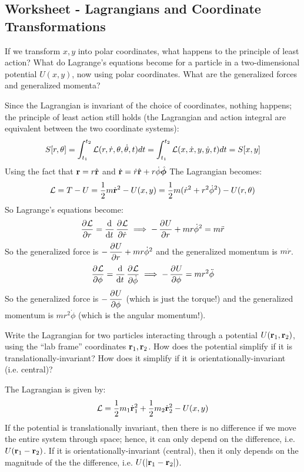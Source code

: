 \documentclass[../PHYS306Notes.tex]{subfiles}
\begin{document}
\subsection{Worksheet - Lagrangians and Coordinate Transformations}
\begin{p}
If we transform $x, y$ into polar coordinates, what happens to the principle of least action? What do Lagrange’s equations become for a particle in a two-dimensional potential $U(x,y)$, now using polar coordinates. What are the generalized forces and generalized momenta? 
\end{p}
\begin{s}
Since the Lagrangian is invariant of the choice of coordinates, nothing happens; the principle of least action still holds (the Lagrangian and action integral are equivalent between the two coordinate systems):
\[S[r, \theta] = \int_{t_1}^{t_2}\mathcal{L}(r, \dot{r}, \theta, \dot{\theta}, t)dt = \int_{t_1}^{t_2} \mathcal{L}(x, \dot{x}, y, \dot{y}, t)dt = S[x, y]\]
Using the fact that $\mathbf{r} = r\hat{\mathbf{r}}$ and $\dot{\mathbf{r}} = \dot{r}\hat{\mathbf{r}} + r\dot{\phi}\hat{\bm{\phi}}$ The Lagrangian becomes:
\[\mathcal{L} = T - U = \frac{1}{2}m\dot{\mathbf{r}}^2 - U(x,y) = \frac{1}{2}m(\dot{r}^2 + r^2\dot{\phi}^2) - U(r, \theta)\]
So Lagrange's equations become:
\[\dpd{\LL}{r} = \dod{}{t}\dpd{\LL}{\dot{r}} \implies -\dpd{U}{r} + mr\dot{\phi}^2 = m\ddot{r}\]
So the generalized force is $-\dpd{U}{r} + mr\dot{\phi}^2$ and the generalized momentum is $m\dot{r}$.
\[\dpd{\LL}{\phi} = \dod{}{t}\dpd{\LL}{\dot{\phi}} \implies -\dpd{U}{\phi} = mr^2\ddot{\phi}  \]
So the generalized force is $-\dpd{U}{\phi}$ (which is just the torque!) and the generalized momentum is $mr^2\dot{\phi}$ (which is the angular momentum!).
\end{s}

\begin{p}
Write the Lagrangian for two particles interacting through a potential $U(\mathbf{r}_1, \mathbf{r}_2)$, using the “lab frame” coordinates $\mathbf{r}_1, \mathbf{r}_2$. How does the potential simplify if it is translationally-invariant? How does it simplify if it is orientationally-invariant (i.e. central)? 
\end{p}
\begin{s}
The Lagrangian is given by:
\[\mathcal{L} = \frac{1}{2}m_1\dot{\mathbf{r}}_1^2 + \frac{1}{2}m_2\dot{\mathbf{r}}_2^2 - U(x,y)\]
If the potential is translationally invariant, then there is no difference if we move the entire system through space; hence, it can only depend on the difference, i.e. $U(\mathbf{r}_1 - \mathbf{r}_2)$. If it is orientationally-invariant (central), then it only depends on the magnitude of the the difference, i.e. $U(\abs{\mathbf{r}_1 - \mathbf{r}_2})$.
\end{s}
\end{document}
